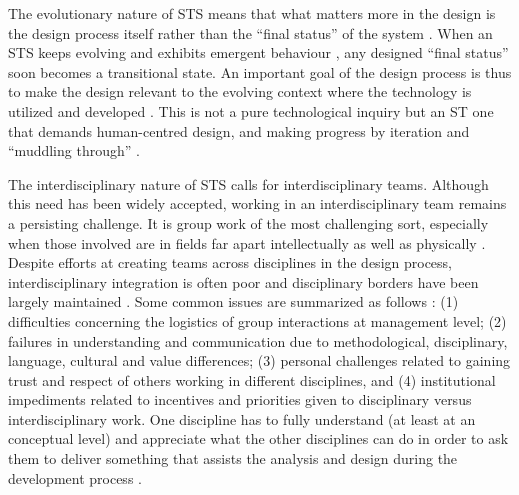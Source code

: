 The evolutionary nature of STS means that what matters more in the design is the design process itself rather than the ``final status'' of the system \cite{Shin2014}. When an STS keeps evolving and exhibits emergent behaviour \cite{Nikolic2009}, any designed ``final status'' soon becomes a transitional state. An important goal of the design process is thus to make the design relevant to the evolving context where the technology is utilized and developed \cite{Shin2014}. This is not a pure technological inquiry but an ST one that demands human-centred design, and making progress by iteration and ``muddling through'' \cite{Norman2015}. 

The interdisciplinary nature of STS calls for interdisciplinary teams. Although this need has been widely accepted, working in an interdisciplinary team remains a persisting challenge. 
It is group work of the most challenging sort, especially when those involved are in fields far apart intellectually as well as physically \cite{Brewer1999}. 
Despite efforts at creating teams across disciplines in the design process, interdisciplinary integration is often poor and disciplinary borders have been largely maintained \cite{Baxter2011}. Some common issues are summarized as follows \cite{Baxter2011,Brewer1999,Norman2015}: (1) difficulties concerning the logistics of group interactions at management level; (2) failures in understanding and communication due to methodological, disciplinary, language, cultural and value differences; (3) personal challenges related to gaining trust and respect of others working in different disciplines, and (4) institutional impediments related to incentives and priorities given to disciplinary versus interdisciplinary work.
% 
One discipline has to fully understand (at least at an conceptual level) and appreciate what the other disciplines can do in order to ask them to deliver something that assists the analysis and design during the development process \cite{Baxter2011}. 


